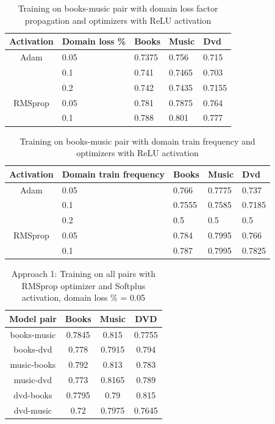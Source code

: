 \documentclass[11pt,a4paper]{article}
\begin{document}
\begin{table}[h]
\begin{center}
\begin{tabular}{|c|l|l|l|l|}
\hline
Activation & \multicolumn{1}{|p{1cm}|}{Domain loss \%}& Books & Music & Dvd \\
\hline
Adam & 0.05 & 0.7375 & 0.756 & 0.715 \\
 & 0.1 & 0.741 & 0.7465 & 0.703 \\
 & 0.2 & 0.742 & 0.7435 & 0.7155 \\
\hline
RMSprop & 0.05 & 0.781 & 0.7875 & 0.764 \\
 & 0.1 & 0.788 & 0.801 & 0.777 \\
\hline
\end{tabular}
\end{center}
\caption{ Training on books-music pair with domain loss factor propagation and optimizers with ReLU activation}
\label{alpha-optimizer-table}
\end{table}

\begin{table}[h]
\begin{center}
\begin{tabular}{|c|l|l|l|l|}
\hline
Activation & \multicolumn{1}{|p{1cm}|}{Domain train frequency}& Books & Music & Dvd \\
\hline
Adam & 0.05 & 0.766 & 0.7775 & 0.737 \\
 & 0.1 & 0.7555 & 0.7585 & 0.7185 \\
 & 0.2 & 0.5 & 0.5 & 0.5 \\
\hline
RMSprop & 0.05 & 0.784 & 0.7995 & 0.766 \\
 & 0.1 & 0.787 & 0.7995 & 0.7825 \\
\hline
\end{tabular}
\end{center}
\caption{ Training on books-music pair with domain train frequency and optimizers with ReLU activation}
\label{1d-optimizer-table}
\end{table}


\begin{table}[h]
\begin{center}
\begin{tabular}{|c|c|c|c|}
\hline
Model pair & Books & Music & DVD \\
\hline
books-music & 0.7845 & 0.815 & 0.7755 \\
\hline
books-dvd & 0.778 & 0.7915 & 0.794 \\
\hline
music-books & 0.792 & 0.813 & 0.783 \\
\hline
music-dvd & 0.773 & 0.8165 & 0.789 \\
\hline
dvd-books & 0.7795 & 0.79 & 0.815 \\
\hline
dvd-music & 0.72 & 0.7975 & 0.7645 \\
\hline
\end{tabular}
\end{center}
\caption{ Approach 1: Training on all pairs with RMSprop optimizer and Softplus activation, domain loss \% = 0.05}
\label{final-results-aplha-table}
\end{table}
\end{document}
